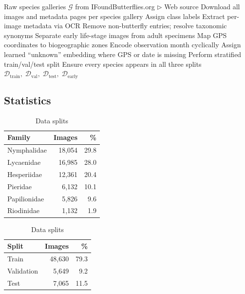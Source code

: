 \documentclass[runningheads]{llncs}
\begin{document}
\begin{algorithm}[H]
\caption{IndoLepAtlas Dataset Collection and Preparation Pipeline}\label{alg:curation}
\begin{algorithmic}[1]
\REQUIRE Raw species galleries $\mathcal{G}$ from IFoundButterflies.org \hfill $\triangleright$ Web source
\STATE Download all images and metadata pages per species gallery
\STATE Assign class labels
\STATE Extract per-image metadata via OCR
\STATE Remove non-butterfly entries; resolve taxonomic synonyms
\STATE Separate early life-stage images from adult specimens
\STATE Map GPS coordinates to biogeographic zones 
\STATE Encode observation month cyclically
\STATE Assign learned ``unknown'' embedding where GPS or date is missing
\STATE Perform stratified train/val/test split
\STATE Ensure every species appears in all three splits
\RETURN $\mathcal{D}_{\text{train}},\; \mathcal{D}_{\text{val}},\; \mathcal{D}_{\text{test}},\; \mathcal{D}_{\text{early}}$
\end{algorithmic}
\end{algorithm}
\subsection{Statistics}
\begin{table}[H]
    \centering
    \begin{minipage}{0.48\linewidth}
        \centering
        \caption{Family distribution (butterflies)}
        \label{tab:family_distribution}
        \small
        \begin{tabular}{lrr}
            \toprule
            Family & Images & \% \\
            \midrule
            Nymphalidae & 18,054 & 29.8 \\
            Lycaenidae & 16,985 & 28.0 \\
            Hesperiidae & 12,361 & 20.4 \\
            Pieridae & 6,132 & 10.1 \\
            Papilionidae & 5,826 & 9.6 \\
            Riodinidae & 1,132 & 1.9 \\
            \bottomrule
        \end{tabular}
    \end{minipage}\hfill
    \begin{minipage}{0.48\linewidth}
        \centering
        \caption{Data splits}
        \label{tab:data_splits}
        \small
        \begin{tabular}{lrr}
            \toprule
            Split & Images & \% \\
            \midrule
            Train & 48,630 & 79.3 \\
            Validation & 5,649 & 9.2 \\
            Test & 7,065 & 11.5 \\
            \bottomrule
        \end{tabular}
    \end{minipage}
\end{table}
\end{document}
